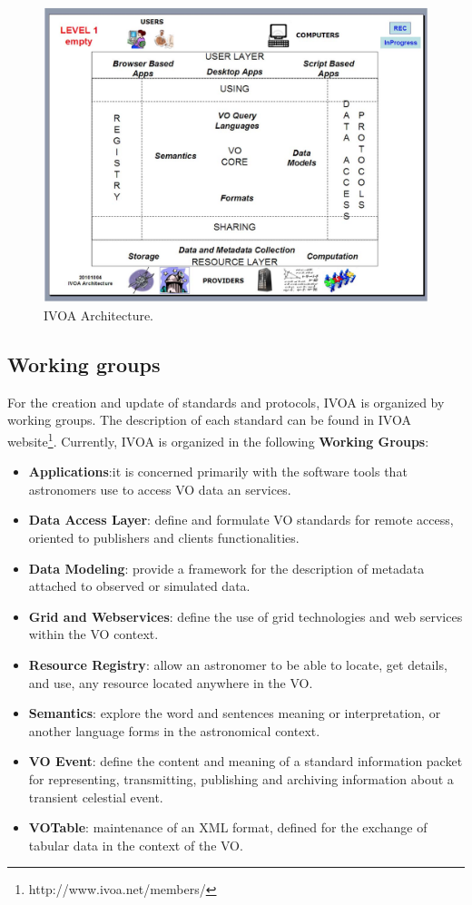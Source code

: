 \begin{figure}%
\begin{center}
	\includegraphics[width=0.9\linewidth]{img/ivoa_arch.png}
	\caption{IVOA Architecture.}
\end{center}
\label{figure:ivoarch}
\end{figure}

\subsection{Working groups}

For the creation and update of standards and protocols, IVOA is organized
by working groups. The description of each standard can be
found in IVOA website\footnote{http://www.ivoa.net/members/}. 
Currently, IVOA is organized in the following \textbf{Working Groups}:
\begin{itemize}
\item \textbf{Applications}:it is concerned primarily with the software
	tools that astronomers use to access VO data an services.
\item \textbf{Data Access Layer}: define and formulate VO standards for
	remote access, oriented to publishers and clients functionalities.
\item \textbf{Data Modeling}: provide a framework for the description
	of metadata attached to observed or simulated data.
\item \textbf{Grid and Webservices}: define the use of grid technologies
	and web services within the VO context.
\item \textbf{Resource Registry}: allow an astronomer to be
	able to locate, get details, and use, any resource located 
	anywhere in the VO.
\item \textbf{Semantics}: explore the word  and sentences
	meaning or interpretation, or another language forms in the
	astronomical context.
\item \textbf{VO Event}: define the content and meaning of a
	standard information packet for representing, transmitting, 
	publishing and archiving information about a transient celestial event.
\item \textbf{VOTable}: maintenance of an XML format, defined
	for the exchange of tabular data in the context of the VO.
\end{itemize}


